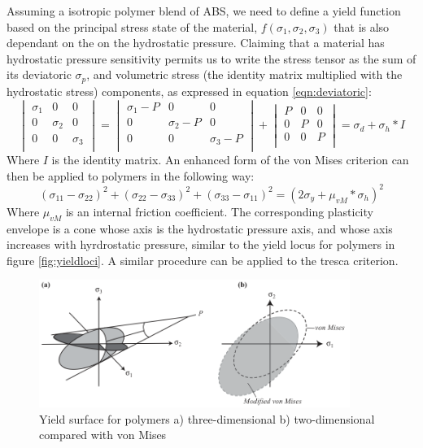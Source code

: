Assuming a isotropic polymer blend of ABS, we need to define a yield function based on the principal stress state of the material, $f(\sigma_1,\sigma_2,\sigma_3)$ that is also dependant on the on the hydrostatic pressure. 
Claiming that a material has hydrostatic pressure sensitivity permits us to write the stress tensor as the sum of its deviatoric $\sigma_p$, and volumetric stress (the identity matrix multiplied with the hydrostatic stress) components, as expressed in equation \ref{eqn:deviatoric}:
\begin{equation}\label{eqn:deviatoric}
\begin{vmatrix}
\sigma_{1}&0&0\\
0&\sigma_{2}&0\\
0&0&\sigma_{3}\\
\end{vmatrix}
=
\begin{vmatrix}
\sigma_{1}-P&0&0\\
0&\sigma_{2}-P&0\\
0&0&\sigma_{3}-P\\
\end{vmatrix}
+
\begin{vmatrix}
P&0&0\\
0&P&0\\
0&0&P\\
\end{vmatrix}
= \sigma_d+\sigma_h*I
\end{equation}Where $I$ is the identity matrix.  
An enhanced form of the von Mises criterion can then be applied to polymers in the following way:
\begin{equation} \label{eqn:yieldpolymers}
  (\sigma_{11}-\sigma_{22})^2+(\sigma_{22}-\sigma_{33})^2+(\sigma_{33}-\sigma_{11})^2=(2\sigma_y+\mu_{vM}*\sigma_h)^2
\end{equation}
Where $\mu_{vM}$ is an internal friction coefficient. The corresponding plasticity envelope is a cone whose axis is the hydrostatic pressure axis, and whose axis increases with hyrdrostatic pressure, similar to the yield locus for polymers in figure \ref{fig:yieldloci}. A similar procedure can be applied to the tresca criterion. 

\begin{figure}[htb]
    \centering
    \includegraphics[width=0.9\textwidth]{chapter_2/figures/yieldpolymers.png}
    \caption{Yield surface for polymers a) three-dimensional b) two-dimensional compared with von Mises \cite{Halary2011PolymerMaterials} }
    \label{fig:Midplane}
\end{figure}

